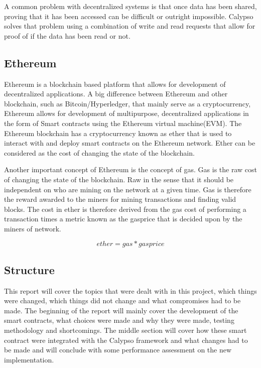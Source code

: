 \documentclass[12pt]{article}
\begin{document}
A common problem with decentralized systems is that once data has been shared, proving that it has been accessed can be difficult or outright impossible. Calypso solves that problem using a combination of write and read requests that allow for proof of if the data has been read or not. 

\subsection{Ethereum}

Ethereum is a blockchain based platform that allows for development of decentralized applications.  A big difference between Ethereum and other blockchain, such as Bitcoin/Hyperledger, that mainly serve as a cryptocurrency, Ethereum allows for development of multipurpose, decentralized applications in the form of Smart contracts using the Ethereum virtual machine(EVM). The Ethereum blockchain has a cryptocurrency known as ether that is used to interact with and deploy smart contracts on the Ethereum network. Ether can be considered as the cost of changing the state of the blockchain. 

Another important concept of Ethereum is the concept of gas. Gas is the raw cost of changing the state of the blockchain. Raw in the sense that it should be independent on who are mining on the network at a given time. Gas is therefore the reward awarded to the miners for mining transactions and finding valid blocks. The cost in ether is therefore derived from the gas cost of performing a transaction times a metric known as the gasprice that is decided upon by the miners of network.

\begin{equation}
    ether = gas * gas price
\end{equation}

\subsection{Structure}

This report will cover the topics that were dealt with in this project, which things were changed, which things did not change and what compromises had to be made. The beginning of the report will mainly cover the development of the smart contracts, what choices were made and why they were made, testing methodology and shortcomings. The middle section will cover how these smart contract were integrated with the Calypso framework and what changes had to be made and will conclude with some performance assessment on the new implementation.
\end{document}
